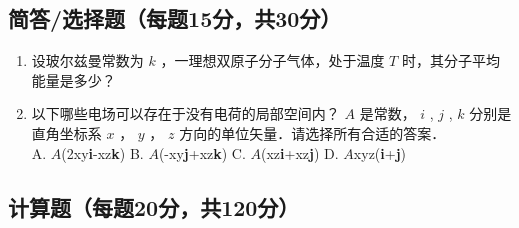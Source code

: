 

\subsection{简答/选择题（每题15分，共30分）}
\begin{enumerate}
\item 设玻尔兹曼常数为 $k$ ，一理想双原子分子气体，处于温度 $T$ 时，其分子平均能量是多少？
\item 以下哪些电场可以存在于没有电荷的局部空间内？ $A$ 是常数， $i$ , $j$ , $k$ 分别是直角坐标系 $x$ ， $y$ ， $z$ 方向的单位矢量．请选择所有合适的答案．\\
A. $A$(2xy\textbf{i}-xz\textbf{k}) B. $A$(-xy\textbf{j}+xz\textbf{k}) C. $A$(xz\textbf{i}+xz\textbf{j}) D. $A$xyz(\textbf{i}+\textbf{j})
\end{enumerate}
\subsection{计算题（每题20分，共120分）}
